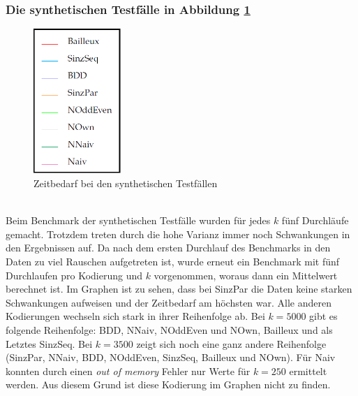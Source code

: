 \documentclass[a4,abstract=on]{scrartcl}
\begin{document}
\subsubsection*{Die synthetischen Testfälle in Abbildung \ref{fig:synth}}


\begin{figure}[htbp]
\includegraphics[width=3.3cm]{Legende.png}
\caption{Zeitbedarf bei den synthetischen Testfällen}
\label{fig:synth}
\end{figure}
\ \\
Beim Benchmark der synthetischen Testfälle wurden für jedes $k$ fünf Durchläufe gemacht. Trotzdem treten durch die hohe Varianz immer noch Schwankungen in den Ergebnissen auf. Da nach dem ersten Durchlauf des Benchmarks in den Daten zu viel Rauschen aufgetreten ist, wurde erneut ein Benchmark mit fünf Durchlaufen pro Kodierung und $k$ vorgenommen, woraus dann ein Mittelwert berechnet ist. Im Graphen ist zu sehen, dass bei SinzPar die Daten keine starken Schwankungen aufweisen und der Zeitbedarf am höchsten war. Alle anderen Kodierungen wechseln sich stark in ihrer Reihenfolge ab. Bei $k=5000$ gibt es folgende Reihenfolge: BDD, NNaiv, NOddEven und NOwn, Bailleux und als Letztes SinzSeq. Bei $k=3500$ zeigt sich noch eine ganz andere Reihenfolge (SinzPar, NNaiv, BDD, NOddEven, SinzSeq, Bailleux und NOwn). Für Naiv konnten durch einen \textit{out of memory} Fehler nur Werte für $k=250$ ermittelt werden. Aus diesem Grund ist diese Kodierung im Graphen nicht zu finden.
\end{document}

